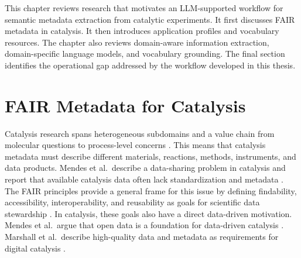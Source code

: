 \label{chap:sota}

This chapter reviews research that motivates an \ac{LLM}-supported workflow for semantic metadata extraction from catalytic experiments.
It first discusses \ac{FAIR} metadata in catalysis.
It then introduces application profiles and vocabulary resources.
The chapter also reviews domain-aware information extraction, domain-specific language models, and vocabulary grounding.
The final section identifies the operational gap addressed by the workflow developed in this thesis.

\section{FAIR Metadata for Catalysis}
\label{sec:fair-data-practice-catalysis}

Catalysis research spans heterogeneous subdomains and a value chain from molecular questions to process-level concerns \cite{wulf2021unified}.
This means that catalysis metadata must describe different materials, reactions, methods, instruments, and data products.
Mendes et al.\ describe a data-sharing problem in catalysis and report that available catalysis data often lack standardization and metadata \cite{mendes2025data}.
The \ac{FAIR} principles provide a general frame for this issue by defining findability, accessibility, interoperability, and reusability as goals for scientific data stewardship \cite{wilkinson2016fair}.
In catalysis, these goals also have a direct data-driven motivation.
Mendes et al.\ argue that open data is a foundation for data-driven catalysis \cite{mendes2021opendata}.
Marshall et al.\ describe high-quality data and metadata as requirements for digital catalysis \cite{marshall2023digital}.

